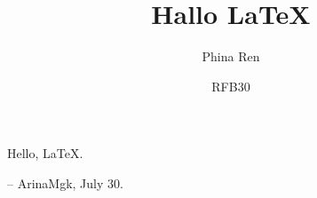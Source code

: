 \documentclass{article}%
\title{Hallo LaTeX}
\author{Phina Ren}
\date{RFB30}
\begin{document}
	
	\maketitle{}
	
	Hello, \LaTeX.
	
		-- ArinaMgk, July 30.
\end{document}
